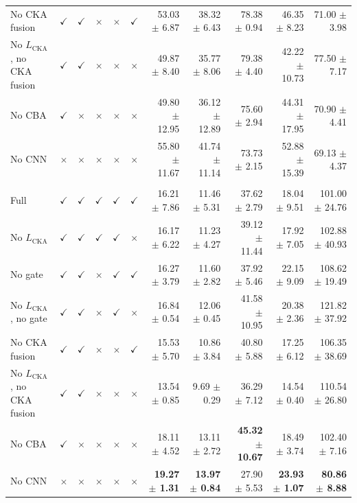 \documentclass[10pt]{article}
\begin{document}
{\begin{longtable}{lccccc rrrrr}
No CKA fusion & $\checkmark$ & $\checkmark$ & $\times$ & $\times$ & $\checkmark$ & 53.03 $\pm$ 6.87 & 38.32 $\pm$ 6.43 & 78.38 $\pm$ 0.94 & 46.35 $\pm$ 8.23 & 71.00 $\pm$ 3.98 \\
No $L_{\mathrm{CKA}}$, no CKA fusion & $\checkmark$ & $\checkmark$ & $\times$ & $\times$ & $\times$ & 49.87 $\pm$ 8.40 & 35.77 $\pm$ 8.06 & 79.38 $\pm$ 4.40 & 42.22 $\pm$ 10.73 & 77.50 $\pm$ 7.17 \\
No CBA & $\checkmark$ & $\times$ & $\times$ & $\times$ & $\times$ & 49.80 $\pm$ 12.95 & 36.12 $\pm$ 12.89 & 75.60 $\pm$ 2.94 & 44.31 $\pm$ 17.95 & 70.90 $\pm$ 4.41 \\
No CNN & $\times$ & $\times$ & $\times$ & $\times$ & $\times$ & 55.80 $\pm$ 11.67 & 41.74 $\pm$ 11.14 & 73.73 $\pm$ 2.15 & 52.88 $\pm$ 15.39 & 69.13 $\pm$ 4.37 \\
\addlinespace[4pt]
\multicolumn{11}{l}{\textit{Source: USOVA $\rightarrow$ Target: OTU}} \\
\midrule
Full & $\checkmark$ & $\checkmark$ & $\checkmark$ & $\checkmark$ & $\checkmark$ & 16.21 $\pm$ 7.86 & 11.46 $\pm$ 5.31 & 37.62 $\pm$ 2.79 & 18.04 $\pm$ 9.51 & 101.00 $\pm$ 24.76 \\
No $L_{\mathrm{CKA}}$ & $\checkmark$ & $\checkmark$ & $\checkmark$ & $\checkmark$ & $\times$ & 16.17 $\pm$ 6.22 & 11.23 $\pm$ 4.27 & 39.12 $\pm$ 11.44 & 17.92 $\pm$ 7.05 & 102.88 $\pm$ 40.93 \\
No gate & $\checkmark$ & $\checkmark$ & $\times$ & $\checkmark$ & $\checkmark$ & 16.27 $\pm$ 3.79 & 11.60 $\pm$ 2.82 & 37.92 $\pm$ 5.46 & 22.15 $\pm$ 9.09 & 108.62 $\pm$ 19.49 \\
No $L_{\mathrm{CKA}}$, no gate & $\checkmark$ & $\checkmark$ & $\times$ & $\checkmark$ & $\times$ & 16.84 $\pm$ 0.54 & 12.06 $\pm$ 0.45 & 41.58 $\pm$ 10.95 & 20.38 $\pm$ 2.36 & 121.82 $\pm$ 37.92 \\
No CKA fusion & $\checkmark$ & $\checkmark$ & $\times$ & $\times$ & $\checkmark$ & 15.53 $\pm$ 5.70 & 10.86 $\pm$ 3.84 & 40.80 $\pm$ 5.88 & 17.25 $\pm$ 6.12 & 106.35 $\pm$ 38.69 \\
No $L_{\mathrm{CKA}}$, no CKA fusion & $\checkmark$ & $\checkmark$ & $\times$ & $\times$ & $\times$ & 13.54 $\pm$ 0.85 & 9.69 $\pm$ 0.29 & 36.29 $\pm$ 7.12 & 14.54 $\pm$ 0.40 & 110.54 $\pm$ 26.80 \\
No CBA & $\checkmark$ & $\times$ & $\times$ & $\times$ & $\times$ & 18.11 $\pm$ 4.52 & 13.11 $\pm$ 2.72 & \textbf{45.32 $\pm$ 10.67} & 18.49 $\pm$ 3.74 & 102.40 $\pm$ 7.16 \\
No CNN & $\times$ & $\times$ & $\times$ & $\times$ & $\times$ & \textbf{19.27 $\pm$ 1.31} & \textbf{13.97 $\pm$ 0.84} & 27.90 $\pm$ 5.53 & \textbf{23.93 $\pm$ 1.07} & \textbf{80.86 $\pm$ 8.88} \\

\end{longtable}}
\end{document}
